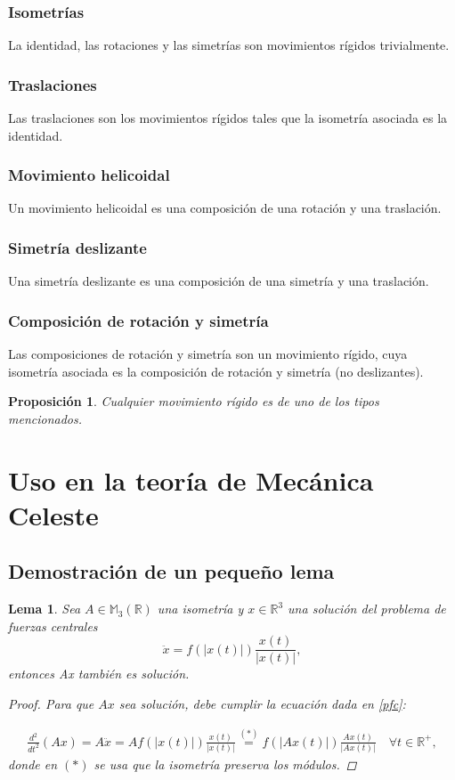 \documentclass[11pt]{article}
\newtheorem{lema}{Lema}[section]
\newtheorem{prop}{Proposición}[section]
\theoremstyle{definition}
\begin{document}
  \subsubsection{Isometrías}
  La identidad, las rotaciones y las simetrías son movimientos rígidos trivialmente.
  \subsubsection{Traslaciones}
  Las traslaciones son los movimientos rígidos tales que la isometría asociada es la identidad.
  \subsubsection{Movimiento helicoidal}
  Un movimiento helicoidal es una composición de una rotación y una traslación.
  \subsubsection{Simetría deslizante}
  Una simetría deslizante es una composición de una simetría y una traslación.
  \subsubsection{Composición de rotación y simetría}
  Las composiciones de rotación y simetría son un movimiento rígido, cuya isometría asociada es la composición de rotación y simetría (no deslizantes).

  \begin{prop}
  Cualquier movimiento rígido es de uno de los tipos mencionados.
  \end{prop}


\section{Uso en la teoría de Mecánica Celeste}

    \subsection {Demostración de un pequeño lema}
    \begin{lema} Sea $A \in \mathbb{M}_{3} \left( \mathbb{R} \right)$ una isometría y  $x\in \mathbb{R}^3$ una solución del problema de fuerzas centrales \begin{equation}\ddot{x}=f(|x(t)|)\frac{x(t)}{|x(t)|}, \label{pfc}\end{equation} entonces Ax también es solución.
    \begin{proof}
    Para que $Ax$ sea solución, debe cumplir la ecuación dada en \ref{pfc}:

    \begin{align*}
	\frac{d^2}{dt^2}\left( Ax \right)=A\ddot{x}=Af(|x(t)|)\frac{x(t)}{|x(t)|}\stackrel{(*)}{=}f(|Ax(t)|)\frac{Ax(t)}{|Ax(t)|} \quad \forall t\in \mathbb{R}^{+},
    \end{align*}
    donde en $(*)$ se usa que la isometría preserva los módulos.

    \end{proof}
\end{lema}
\end{document}
